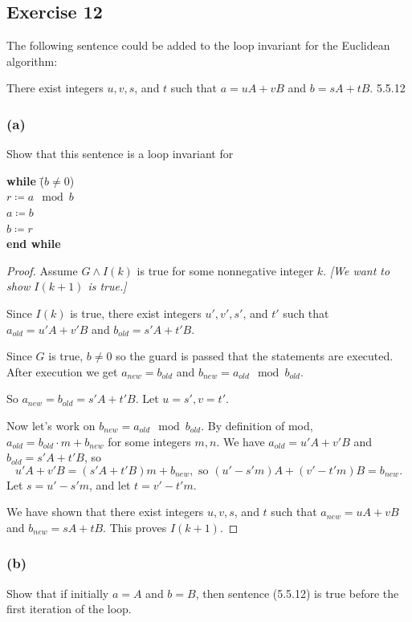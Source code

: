 \documentclass[14pt]{extarticle}
\newcommand{\cy}{\color{cyan}}
\begin{document}
\subsection{Exercise 12}
The following sentence could be added to the loop invariant for the Euclidean algorithm:

There exist integers $u, v, s$, and $t$ such that $a = uA + vB$ and $b = sA + tB$. {\cy 5.5.12}

\subsubsection{(a)}
Show that this sentence is a loop invariant for 
\begin{tabbing}
{\bf while} \= ($b \neq 0$) \\
\> $r \coloneqq a \mod b$ \\
\> $a \coloneqq b$ \\
\> $b \coloneqq r$ \\      
{\bf end while}
\end{tabbing}

\begin{proof}
Assume $G \wedge I(k)$ is true for some nonnegative integer $k$. {\it [We want to show $I(k+1)$ is true.]}

Since $I(k)$ is true, there exist integers $u', v', s'$, and $t'$ such that $a_{old} = u'A + v'B$ and $b_{old} = s'A + t'B$.

Since $G$ is true, $b \neq 0$ so the guard is passed that the statements are executed. After execution we get
$a_{new} = b_{old}$ and $b_{new} = a_{old} \mod b_{old}$.

So $a_{new} = b_{old} = s'A + t'B$. Let $u = s', v = t'$.

Now let's work on $b_{new} = a_{old} \mod b_{old}$. By definition of mod, \(a_{old} = b_{old} \cdot m + b_{new}\) 
for some integers $m,n$. We have $a_{old} = u'A + v'B$ and $b_{old} = s'A + t'B$, so
\[
u'A + v'B = (s'A + t'B)m + b_{new}, \text{ so } (u'-s'm)A + (v'-t'm)B = b_{new}.
\]
Let $s = u'-s'm$, and let $t = v'-t'm$.

We have shown that there exist integers $u, v, s$, and $t$ such that $a_{new} = uA + vB$ and $b_{new} = sA + tB$.
This proves $I(k+1)$.
\end{proof}

\subsubsection{(b)}
Show that if initially $a = A$ and $b = B$, then sentence (5.5.12) is true before the first iteration of the loop.
\end{document}

